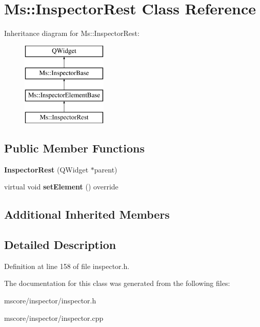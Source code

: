 \hypertarget{class_ms_1_1_inspector_rest}{}\section{Ms\+:\+:Inspector\+Rest Class Reference}
\label{class_ms_1_1_inspector_rest}
Inheritance diagram for Ms\+:\+:Inspector\+Rest\+:\begin{figure}[H]
\begin{center}
\leavevmode
\includegraphics[height=4.000000cm]{class_ms_1_1_inspector_rest}
\end{center}
\end{figure}
\subsection*{Public Member Functions}
\begin{DoxyCompactItemize}
\item 
\mbox{\label{class_ms_1_1_inspector_rest_ab5a2aabb33882464c6e27f9e1f85526d}} 
{\bfseries Inspector\+Rest} (Q\+Widget $\ast$parent)
\item 
\mbox{\label{class_ms_1_1_inspector_rest_a209b91b1e53176c17ec9bf64650184d9}} 
virtual void {\bfseries set\+Element} () override
\end{DoxyCompactItemize}
\subsection*{Additional Inherited Members}


\subsection{Detailed Description}


Definition at line 158 of file inspector.\+h.



The documentation for this class was generated from the following files\+:\begin{DoxyCompactItemize}
\item 
mscore/inspector/inspector.\+h\item 
mscore/inspector/inspector.\+cpp\end{DoxyCompactItemize}
